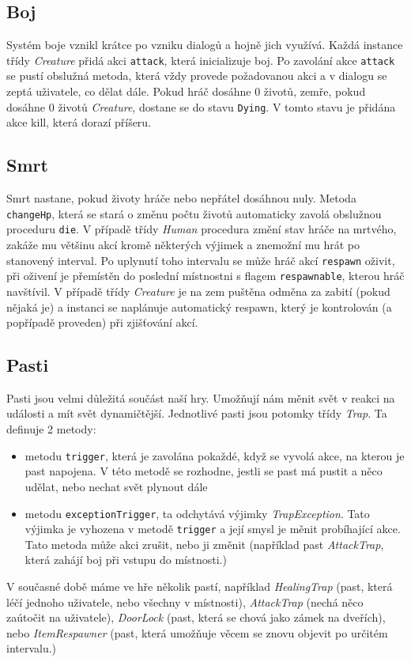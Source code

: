 \documentclass[11pt, a4paper]{article}
\def\class#1{\emph{#1}}
\begin{document}
\subsection{Boj}
\label{combat}
Systém boje vznikl krátce po vzniku dialogů a hojně jich využívá. Každá instance třídy \class{Creature} přidá akci \texttt{attack}, která inicializuje boj. Po zavolání akce \texttt{attack} se pustí obslužná metoda, která vždy provede požadovanou akci a v dialogu se zeptá uživatele, co dělat dále. Pokud hráč dosáhne 0 životů, zemře, pokud dosáhne 0 životů \class{Creature}, dostane se do stavu \texttt{Dying}. V tomto stavu je přidána akce kill, která dorazí příšeru.

\subsection{Smrt}

Smrt nastane, pokud životy hráče nebo nepřátel dosáhnou nuly. Metoda \texttt{changeHp}, která se stará o změnu počtu životů automaticky zavolá obslužnou proceduru \texttt{die}. V případě třídy \class{Human} procedura změní stav hráče na mrtvého, zakáže mu většinu akcí kromě některých výjimek a znemožní mu hrát po stanovený interval. Po uplynutí toho intervalu se může hráč akcí \texttt{respawn} oživit, při oživení je přemístěn do poslední místnostni s flagem \texttt{respawnable}, kterou hráč navštívil. V případě třídy \class{Creature} je na zem puštěna odměna za zabití (pokud nějaká je) a instanci se naplánuje automatický respawn, který je kontrolován (a popřípadě proveden) při zjišťování akcí.

\subsection{Pasti}

Pasti jsou velmi důležitá součást naší hry. Umožňují nám měnit svět v reakci na události a mít svět dynamičtější. Jednotlivé pasti jsou potomky třídy \class{Trap}. Ta definuje 2 metody:
\begin{itemize}
\item metodu \texttt{trigger}, která je zavolána pokaždé, když se vyvolá akce, na kterou je past napojena. V této metodě se rozhodne, jestli se past má pustit a něco udělat, nebo nechat svět plynout dále
\item metodu \texttt{exceptionTrigger}, ta odchytává výjimky \class{TrapException}. Tato výjimka je vyhozena v metodě \texttt{trigger} a její smysl je měnit probíhající akce. Tato metoda může akci zrušit, nebo ji změnit (například past \class{AttackTrap}, která zahájí boj při vstupu do místnosti.)
\end{itemize}
V současné době máme ve hře několik pastí, například \class{HealingTrap} (past, která léčí jednoho uživatele, nebo všechny v místnosti), \class{AttackTrap} (nechá něco zaútočit na uživatele), \class{DoorLock} (past, která se chová jako zámek na dveřích), nebo \class{ItemRespawner} (past, která umožňuje věcem se znovu objevit po určitém intervalu.)
\end{document}

